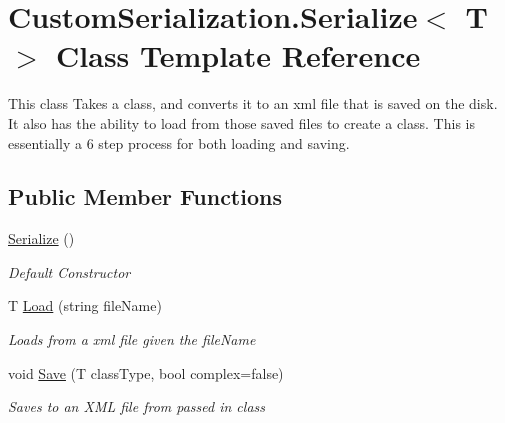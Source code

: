 \hypertarget{class_custom_serialization_1_1_serialize_3_01_t_01_4}{\section{Custom\-Serialization.\-Serialize$<$ T $>$ Class Template Reference}
\label{d3/d5e/class_custom_serialization_1_1_serialize_3_01_t_01_4}
}


This class Takes a class, and converts it to an xml file that is saved on the disk. It also has the ability to load from those saved files to create a class. This is essentially a 6 step process for both loading and saving.  


\subsection*{Public Member Functions}
\begin{DoxyCompactItemize}
\item 
\hyperlink{class_custom_serialization_1_1_serialize_3_01_t_01_4_a18418aaac4ebc3372de3410626a0ea55}{Serialize} ()
\begin{DoxyCompactList}\small\item\em Default Constructor \end{DoxyCompactList}\item 
T \hyperlink{class_custom_serialization_1_1_serialize_3_01_t_01_4_a8e93c80cca07e34d0a30c4bc53ddfb17}{Load} (string file\-Name)
\begin{DoxyCompactList}\small\item\em Loads from a xml file given the file\-Name \end{DoxyCompactList}\item 
void \hyperlink{class_custom_serialization_1_1_serialize_3_01_t_01_4_af5669ea71316b3920351b64193d47d79}{Save} (T class\-Type, bool complex=false)
\begin{DoxyCompactList}\small\item\em Saves to an X\-M\-L file from passed in class \end{DoxyCompactList}\end{DoxyCompactItemize}
